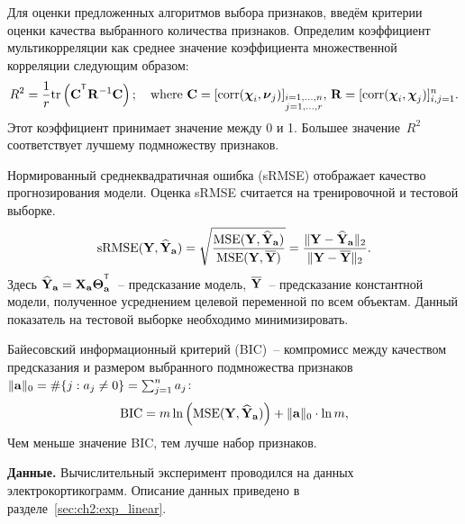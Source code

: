 Для оценки предложенных алгоритмов выбора признаков, введём критерии оценки качества выбранного количества признаков.
Определим коэффициент мультикорреляции как среднее значение коэффициента множественной корреляции следующим образом:
\begin{equation*}
R^2 = \frac{1}{r} \text{tr} \left( \bC^{\T} \mathbf{R}^{-1} \bC \right); \quad \text{where }\bC = [ \text{corr}(\bchi_i, \bnu_j)]_{\substack{i=1, \dots, n \\ j=1, \dots, r}}, \, \mathbf{R} = [ \text{corr}(\bchi_i, \bchi_j)]_{i, j = 1}^n.
\end{equation*}
Этот коэффициент принимает значение между 0 и 1. Большее значение~$R^2$ соответствует лучшему подмножеству признаков.

Нормированный среднеквадратичная ошибка (sRMSE) отображает качество прогнозирования модели. Оценка sRMSE считается на тренировочной и тестовой выборке.
\begin{equation*}
\text{sRMSE}(\mathbf{Y}, \widehat{\mathbf{Y}}_{\mathbf{a}}) = \sqrt{\frac{\text{MSE} (\mathbf{Y}, \widehat{\mathbf{Y}}_{\mathbf{a}})}{\text{MSE} (\mathbf{Y}, \overline{\mathbf{Y}})}} =  \frac{\| \mathbf{Y} - \widehat{\mathbf{Y}}_{\mathbf{a}} \|_2}{\| \mathbf{Y} - \overline{\mathbf{Y}} \|_2}.
\end{equation*}
Здесь $\widehat{\bY}_{\ba} = \bX_{\ba} \bTheta_{\ba}^{\T}$~-- предсказание модель, $\overline{\mathbf{Y}}$~-- предсказание константной модели, полученное усреднением целевой переменной по всем объектам.
Данный показатель на тестовой выборке необходимо минимизировать.

Байесовский информационный критерий (BIC)~-- компромисс между качеством предсказания и размером выбранного подмножества признаков~$\|\mathbf{a}\|_0 = \#\{j: a_j \neq 0\}= \sum_{j=1}^n a_j$:
\begin{equation*}
\text{BIC} = m \ln \left( \text{MSE} ( \mathbf{Y}, \widehat{\mathbf{Y}}_{\mathbf{a}})\right) + \| \mathbf{a} \|_0 \cdot \ln m,
\end{equation*}
Чем меньше значение BIC, тем лучше набор признаков.

\textbf{Данные.}
Вычислительный эксперимент проводился на данных электрокортикограмм. Описание данных приведено в разделе~\ref{sec:ch2:exp_linear}.

